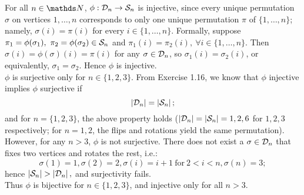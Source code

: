 \documentclass{homework}
\begin{document}
\begin{solution}
  For all $n\in \N$, $\phi:\mathcal{D}_n\to \mathcal{S}_n$ is  injective, since every unique permutation
  $\sigma$ on vertices $1,\ldots,n$ corresponds to only one unique permutation $\pi$ of $\{
  1,\ldots,n \}$; namely, $\sigma(i)=\pi(i)$ for every $i\in \{ 1,\ldots,n \}$. Formally, suppose
  $\pi_1=\phi(\sigma_1),\ \pi_2=\phi(\sigma_2)\in \cS_n$ and $\pi_1(i)=\pi_2(i),\ \forall i\in \{
  1,\ldots,n \}$. Then $\sigma(i)=\phi(\sigma)(i)=\pi(i)$ for any $\sigma\in \mathcal{D}_n$, so
  $\sigma_1(i)=\sigma_2(i)$, or equivalently, $\sigma_1=\sigma_2$. Hence $\phi$ is injective.\\
  $\phi$ is surjective only for $n\in \{ 1,2,3 \}$. From Exercise 1.16, we know that  $\phi$ 
  injective implies $\phi$ surjective if \[\left| \mathcal{D}_n \right| = \left| \mathcal{S}_n \right|;\] and for
  $n=\{ 1,2,3 \}$, the above property holds ($\left| \mathcal{D}_n \right| =\left| \mathcal{S}_n \right|=1,2,6$ for
  $1,2,3$ respectively; for $n=1,2$, the flips and rotations yield the same permutation). However,
  for any $n>3$, $\phi$ is not surjective. There does not exist a  $\sigma\in \mathcal{D}_n$ that fixes two
  vertices and rotates the rest, i.e.: \[
    \sigma(1)=1,\sigma(2)=2,\sigma(i)=i+1~\text{for}~2<i<n,\sigma(n)=3;
  \] hence $\left| \mathcal{S}_n \right| > \left| \mathcal{D}_n \right|,$ and surjectivity fails.\\
  Thus $\phi$ is bijective for $n\in \{ 1,2,3 \}$, and injective only for all $n>3$.
\end{solution}
\end{document}
